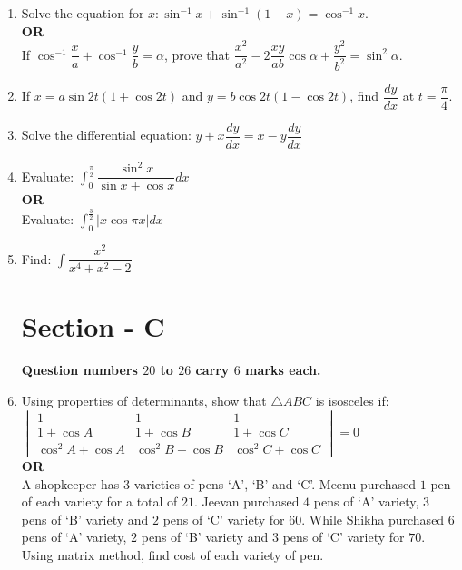 \documentclass[12pt,-letter paper]{article}
\newcommand{\mydet}[1]{\ensuremath{\begin{vmatrix}#1\end{vmatrix}}}
\providecommand{\brak}[1]{\ensuremath{\left(#1\right)}}
\begin{document}
\begin{enumerate}
	\item Solve the equation for $x : \sin^{-1}{x} + \sin^{-1}{\brak{1-x}} = \cos^{-1}{x}$.\\
	\textbf{OR}\\
	If $ \cos^{-1}{\dfrac{x}{a}} + \cos^{-1}{\dfrac{y}{b}} = \alpha$, prove that $ \dfrac{x^2}{a^2} - 2\dfrac{xy}{ab}\cos{\alpha} + \dfrac{y^2}{b^2} = \sin^2{\alpha}$.\\
	
	\item If $x = a\sin{2t}\brak{1 + \cos{2t}}$ and $y = b\cos{2t}\brak{1 - \cos{2t}}$, find $ \dfrac{dy}{dx}$ at $t = \dfrac{\pi}{4}$.\\
	
	\item Solve the differential equation: $y + x\dfrac{dy}{dx} = x - y\dfrac{dy}{dx}$\\
	
	\item Evaluate: $ \int^{\frac{\pi}{2}}_0{\dfrac{\sin^2{x}}{\sin{x} + \cos{x}}dx}$\\
	\textbf{OR}\\
	Evaluate: $\int^{\frac{3}{2}}_0{|x\cos{\pi x}|dx}$\\
	
	\item Find: $\int{\dfrac{x^2}{x^4 + x^2 -2}}$\\
	
\section*{\textbf{Section - C}}
\textbf{Question numbers $20$ to $26$ carry $6$ marks each.}\\

	\item Using properties of determinants, show that $\triangle{ABC}$ is isosceles if:\\
	$\mydet{1 & 1 & 1 \\ 1 + \cos{A} & 1 + \cos{B} & 1 + \cos{C} \\ \cos^2{A} + \cos{A} & \cos^2{B} + \cos{B} & \cos^2{C} + \cos{C} } = 0$\\
	\textbf{OR}\\
	A shopkeeper has $3$ varieties of pens `A', `B' and `C'. Meenu purchased $1$ pen of each variety for a total of \rupee$21$. Jeevan purchased $4$ pens of `A' variety, $3$ pens of `B' variety and $2$ pens of `C' variety for \rupee$60$. While Shikha purchased $6$ pens of `A' variety, $2$ pens of `B' variety and $3$ pens of `C' variety for \rupee$70$. Using matrix method, find cost of each variety of pen.\\
	

\end{enumerate}
\end{document}
